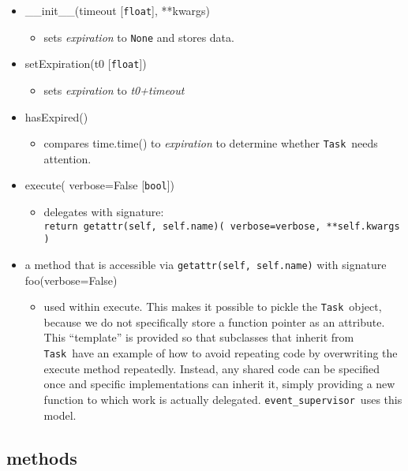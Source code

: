 \documentclass{article}
\newcommand{\Task}{\texttt{Task}}
\newcommand{\eventSupervisor}{\texttt{event\_supervisor}}
\newcommand{\pythonfloat}{\texttt{float}}
\newcommand{\pythonbool}{\texttt{bool}}
\begin{document}
\begin{itemize}
    \item{\_\_init\_\_(timeout [\pythonfloat], **kwargs)
        \begin{itemize}
            \item{sets \textit{expiration} to \texttt{None} and stores data.}
        \end{itemize}
         }
    \item{setExpiration(t0 [\pythonfloat])
        \begin{itemize}
            \item{sets \textit{expiration} to \textit{t0+timeout}}
        \end{itemize}
         }
    \item{hasExpired()
        \begin{itemize}
            \item{compares time.time() to \textit{expiration} to determine whether \Task~needs attention.}
        \end{itemize}
         }
    \item{execute( verbose=False [\pythonbool])
        \begin{itemize}
            \item{delegates with signature: \\ \texttt{return getattr(self, self.name)( verbose=verbose, **self.kwargs )}}
        \end{itemize}
         }
    \item{a method that is accessible via \texttt{getattr(self, self.name)} with signature foo(verbose=False)
        \begin{itemize}
            \item{used within execute. This makes it possible to pickle the \Task~object, because we do not specifically store a function pointer as an attribute. This ``template'' is provided so that subclasses that inherit from \Task~have an example of how to avoid repeating code by overwriting the execute method repeatedly. Instead, any shared code can be specified once and specific implementations can inherit it, simply providing a new function to which work is actually delegated. \eventSupervisor~uses this model.}
        \end{itemize}
         }
\end{itemize}


\subsection{methods}
\label{sec: methods}
\end{document}
